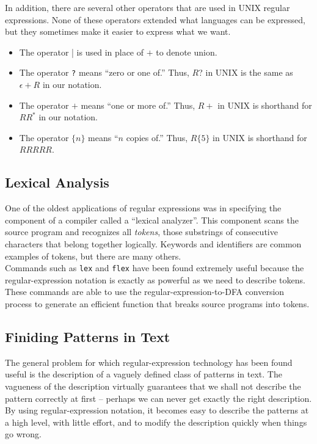 \documentclass[]{article}
\begin{document}
    In addition, there are several other operators that are used in UNIX
    regular expressions. None of these operators extended what languages can
    be expressed, but they sometimes make it easier to express what we want.
      \begin{itemize}
        \item The operator | is used in place of $+$ to denote union.
        \item The operator \texttt{?} means ``zero or one of.'' Thus, $R$? in
        UNIX is the same as $\epsilon + R$ in our notation.
        \item The operator $+$ means ``one or more of.'' Thus, $R+$ in UNIX is
        shorthand for $RR^*$ in our notation.
        \item The operator $\{ n \}$ means ``$n$ copies of.'' Thus, $R\{5\}$ in
        UNIX is shorthand for $RRRRR$.
      \end{itemize}

  \subsection*{Lexical Analysis}
    One of the oldest applications of regular expressions was in specifying the
    component of a compiler called a ``lexical analyzer''. This component scans
    the source program and recognizes all \emph{tokens}, those substrings of
    consecutive characters that belong together logically. Keywords and
    identifiers are common examples of tokens, but there are many others. \\
    \indent Commands such as \texttt{lex} and \texttt{flex} have been found
    extremely useful because the regular-expression notation is exactly as
    powerful as we need to describe tokens. These commands are able to use the
    regular-expression-to-DFA conversion process to generate an efficient
    function that breaks source programs into tokens.

  \subsection*{Finiding Patterns in Text}
    The general problem for which regular-expression technology has been found
    useful is the description of a vaguely defined class of patterns in text.
    The vagueness of the description virtually guarantees that we shall not
    describe the pattern correctly at first -- perhaps we can never get exactly
    the right description. By using regular-expression notation, it becomes easy
    to describe the patterns at a high level, with little effort, and to modify
    the description quickly when things go wrong.
\end{document}
